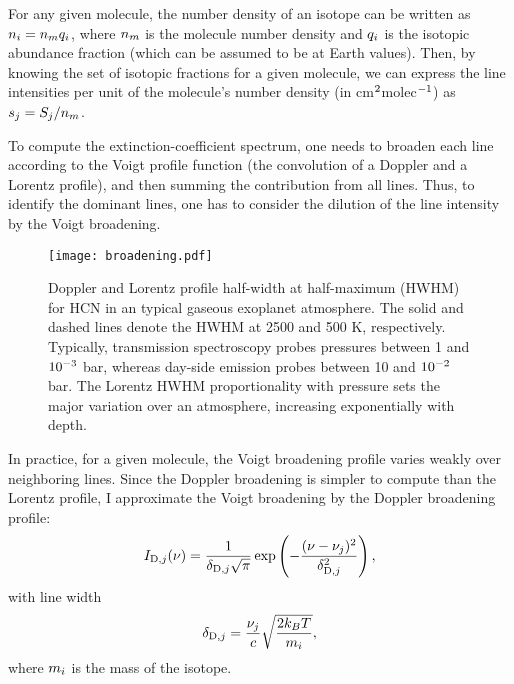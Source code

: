 \documentclass[tighten, times, twocolumn, trackchanges]{aastex61}
\newcommand\ttt[1]{10\sp{#1}}
\let\oldmsp=\sp
\let\oldmsb=\sb
\def\sp#1{\ifmmode
           \oldmsp{#1}%
         \else\strut\raise.85ex\hbox{\scriptsize #1}\fi}
\def\sb#1{\ifmmode
           \oldmsb{#1}%
         \else\strut\raise-.54ex\hbox{\scriptsize #1}\fi}
\begin{document}
For any given molecule, the number density of an isotope can be
written as $n\sb{i} = n\sb{m} q\sb{i}$, where $n\sb{m}$ is the
molecule number density and $q\sb{i}$ is the isotopic abundance
fraction (which can be assumed to be at Earth values).
Then, by knowing the set of isotopic fractions for a given
molecule, we can express the line intensities per unit of the
molecule's number density (in cm$\sp{2}$molec$\sp{-1}$) as $s\sb{j} =
S\sb{j}/n\sb{m}$.


To compute the extinction-coefficient spectrum, one needs to broaden
each line according to the Voigt profile function (the convolution of a
Doppler and a Lorentz profile), and then summing the contribution from
all lines.  Thus, to identify the dominant lines, one has to consider
the dilution of the line intensity by the Voigt broadening.

\begin{figure}[t]
\centering
\texttt{[image: broadening.pdf]}
\caption{
Doppler and Lorentz profile half-width at half-maximum (HWHM) for HCN
in an typical gaseous exoplanet atmosphere.  The solid and dashed
lines denote the HWHM at 2500 and 500 K, respectively.  Typically,
transmission spectroscopy probes pressures between 1 and
$\ttt{-3}$ bar, whereas day-side emission probes between 10 and
$\ttt{-2}$ bar.  The Lorentz HWHM proportionality with pressure sets
the major variation over an atmosphere, increasing exponentially with
depth.}
\label{fig:broadening}
\end{figure}

In practice, for a given molecule, the Voigt broadening profile varies
weakly over neighboring lines.  Since the Doppler broadening is
simpler to compute than the Lorentz profile, I approximate the
Voigt broadening by the Doppler broadening profile:
\begin{equation}
\label{eq:doppler}
I\sb{{\rm D},j}(\nu) = \frac{1}{\delta\sb{{\rm D},j}\sqrt{\pi}}
  \exp\left(-\frac{(\nu - \nu\sb{j})\sp{2}}{\delta\sb{{\rm D},j}\sp{2}}\right), 
\end{equation}
with line width
\begin{equation}
\delta\sb{{\rm D},j} = \frac{\nu\sb{j}}{c} \sqrt\frac{2 k\sb{B} T}{m\sb{i}},
\end{equation}
where $m\sb{i}$ is the mass of the isotope.
\end{document}
